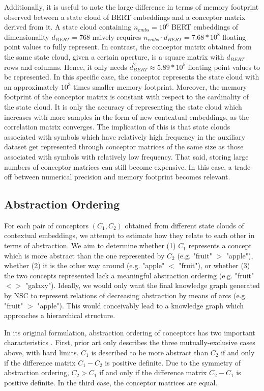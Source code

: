 Additionally, it is useful to note the large difference in terms of memory footprint observed between a state cloud of BERT embeddings and a conceptor matrix derived from it. A state cloud containing $n_{embs} = 10^6$ BERT embeddings of dimensionality $d_{BERT}=768$ naively requires $n_{embs} \cdot d_{BERT} = 7.68 * 10^8$ floating point values to fully represent. In contrast, the conceptor matrix obtained from the same state cloud, given a certain aperture, is a square matrix with $d_{BERT}$ rows and columns. Hence, it only needs $d_{BERT}^2 \approx 5.89 * 10^5$ floating point values to be represented. In this specific case, the conceptor represents the state cloud with an approximately $10^3$ times smaller memory footprint. Moreover, the memory footprint of the conceptor matrix is constant with respect to the cardinality of the state cloud. It is only the accuracy of representing the state cloud which increases with more samples in the form of new contextual embeddings, as the correlation matrix converges. The implication of this is that state clouds associated with symbols which have relatively high frequency in the auxiliary dataset get represented through conceptor matrices of the same size as those associated with symbols with relatively low frequency. That said, storing large numbers of conceptor matrices can still become expensive. In this case, a trade-off between numerical precision and memory footprint becomes relevant.

\subsection{Abstraction Ordering}

For each pair of conceptors $(C_1, C_2)$ obtained from different state clouds of contextual embeddings, we attempt to estimate how they relate to each other in terms of abstraction. We aim to determine whether (1) $C_1$ represents a concept which is more abstract than the one represented by $C_2$ (e.g. "fruit" $>$ "apple"), whether (2) it is the other way around (e.g. "apple" $<$ "fruit"), or whether (3) the two concepts represented lack a meaningful abstraction ordering (e.g. "fruit" $<>$ "galaxy"). Ideally, we would only want the final knowledge graph generated by NSC to represent relations of decreasing abstraction by means of arcs (e.g. "fruit" $>$ "apple"). This would conceivably lead to a knowledge graph which approaches a hierarchical structure.

In its original formulation, abstraction ordering of conceptors has two important characteristics \citep{jaeger_controlling_2017}. First, prior art only describes the three mutually-exclusive cases above, with hard limits. $C_1$ is described to be more abstract than $C_2$ if and only if the difference matrix $C_1 - C_2$ is positive definite. Due to the symmetry of abstraction ordering, $C_2 > C_1$ if and only if the difference matrix $C_2 - C_1$ is positive definite. In the third case, the conceptor matrices are equal.

